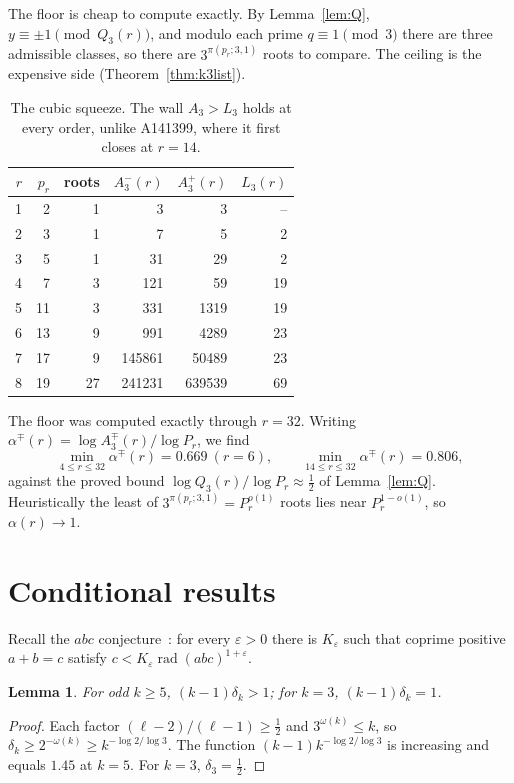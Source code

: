\documentclass[11pt]{article}
\newtheorem{lemma}[theorem]{Lemma}
\theoremstyle{definition}
\theoremstyle{remark}
\newcommand{\rad}{\operatorname{rad}}
\begin{document}
The floor is cheap to compute exactly. By Lemma~\ref{lem:Q},
$y\equiv\pm1\pmod{Q_3(r)}$, and modulo each prime $q\equiv1\pmod 3$ there are
three admissible classes, so there are $3^{\pi(p_r;3,1)}$ roots to compare.
The ceiling is the expensive side (Theorem~\ref{thm:k3list}).

\begin{table}[ht]
\centering
\caption{The cubic squeeze. The wall $A_3>L_3$ holds at every order, unlike
A141399, where it first closes at $r=14$.}
\label{tab:squeeze}
\begin{tabular}{rrrrrr}
\toprule
$r$ & $p_r$ & roots & $A_3^-(r)$ & $A_3^+(r)$ & $L_3(r)$\\
\midrule
1 & 2 & 1 & 3 & 3 & --\\
2 & 3 & 1 & 7 & 5 & 2\\
3 & 5 & 1 & 31 & 29 & 2\\
4 & 7 & 3 & 121 & 59 & 19\\
5 & 11 & 3 & 331 & 1319 & 19\\
6 & 13 & 9 & 991 & 4289 & 23\\
7 & 17 & 9 & 145861 & 50489 & 23\\
8 & 19 & 27 & 241231 & 639539 & 69\\
\bottomrule
\end{tabular}
\end{table}

The floor was computed exactly through $r=32$. Writing
$\alpha^{\mp}(r)=\log A_3^{\mp}(r)/\log P_r$, we find
\[
\min_{4\le r\le32}\alpha^{\mp}(r)=0.669\ (r=6),\qquad
\min_{14\le r\le32}\alpha^{\mp}(r)=0.806,
\]
against the proved bound $\log Q_3(r)/\log P_r\approx\tfrac12$ of
Lemma~\ref{lem:Q}. Heuristically the least of $3^{\pi(p_r;3,1)}=P_r^{o(1)}$
roots lies near $P_r^{1-o(1)}$, so $\alpha(r)\to1$.

\section{Conditional results}\label{sec:conditional}

Recall the $abc$ conjecture~\cite{Masser,Oesterle}: for every $\varepsilon>0$
there is $K_\varepsilon$ such that coprime positive $a+b=c$ satisfy
$c<K_\varepsilon\rad(abc)^{1+\varepsilon}$.

\begin{lemma}\label{lem:kdelta}
For odd $k\ge5$, $(k-1)\delta_k>1$; for $k=3$, $(k-1)\delta_k=1$.
\end{lemma}
\begin{proof}
Each factor $(\ell-2)/(\ell-1)\ge\frac12$ and $3^{\omega(k)}\le k$, so
$\delta_k\ge2^{-\omega(k)}\ge k^{-\log2/\log3}$. The function
$(k-1)k^{-\log2/\log3}$ is increasing and equals $1.45$ at $k=5$. For $k=3$,
$\delta_3=\frac12$.
\end{proof}
\end{document}
